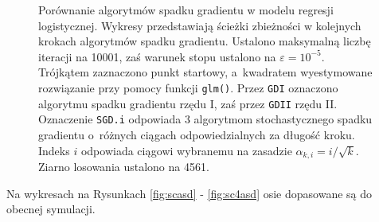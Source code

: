 \begin{figure}[h!]
\begin{center}
\begin{subfigure}[h!]{0.49\textwidth}
            \end{subfigure}
\end{center}
\caption{\label{fig:sc5asd} Porównanie algorytmów spadku gradientu w modelu regresji logistycznej. Wykresy przedstawiają ścieżki zbieżności w kolejnych krokach algorytmów spadku gradientu. Ustalono maksymalną liczbę iteracji na 10001, zaś warunek stopu ustalono na $\varepsilon=10^{-5}$. Trójkątem zaznaczono punkt startowy, a~kwadratem wyestymowane rozwiązanie przy pomocy funkcji \texttt{glm()}. Przez \texttt{GDI} oznaczono algorytmu spadku gradientu rzędu I, zaś przez \texttt{GDII} rzędu II. Oznaczenie \texttt{SGD.i} odpowiada 3 algorytmom stochastycznego spadku gradientu o~różnych ciągach odpowiedzialnych za długość kroku. Indeks $i$ odpowiada ciągowi wybranemu na zasadzie $\alpha_{k,i} = i/\sqrt{k}$. Ziarno losowania ustalono na 4561.}
\end{figure}

Na wykresach na Rysunkach \ref{fig:scasd} - \ref{fig:sc4asd} osie dopasowane są do obecnej symulacji. 

\newpage

